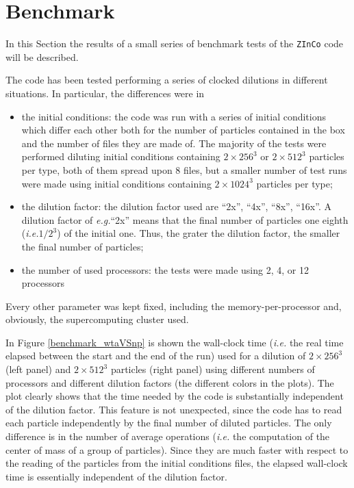 \documentclass[11pt,a4paper,titlepage]{article}
\newcommand{\virg}[1]{``{#1}''}
\newcommand{\ie}{\emph{i.e.}\xspace}
\newcommand{\eg}{\emph{e.g.}\xspace}
\newcommand{\zinco}{\texttt{ZInCo}\xspace}
\begin{document}
\section{Benchmark}
In this Section the results of a small series of benchmark tests of the \zinco code will be described.

The code has been tested performing a series of clocked dilutions in different situations. In particular, the differences were in
\begin{itemize}
\item the initial conditions: the code was run with a series of initial conditions which differ each other both for the number of particles contained in the box and the number of files they are made of. The majority of the tests were performed diluting initial conditions containing $2 \times 256^3$ or $2 \times 512^3$ particles per type, both of them spread upon 8 files, but a smaller number of test runs were made using initial conditions containing $2 \times 1024^3$ particles per type;
\item the dilution factor: the dilution factor used are \virg{2x}, \virg{4x}, \virg{8x}, \virg{16x}. A dilution factor of \eg \virg{2x} means that the final number of particles one eighth (\ie $1/2^3$) of the initial one. Thus, the grater the dilution factor, the smaller the final number of particles;
\item the number of used processors: the tests were made using 2, 4, or 12 processors
\end{itemize}
Every other parameter was kept fixed, including the memory-per-processor and, obviously, the supercomputing cluster used.

In Figure \ref{benchmark_wtaVSnp} is shown the wall-clock time (\ie the real time elapsed between the start and the end of the run) used for a dilution of $2 \times 256^3$ (left panel) and $2 \times 512^3$ particles (right panel) using different numbers of processors and different dilution factors (the different colors in the plots). The plot clearly shows that the time needed by the code is substantially independent of the dilution factor. This feature is not unexpected, since the code has to read each particle independently by the final number of diluted particles. The only difference is in the number of average operations (\ie the computation of the center of mass of a group of particles). Since they are much faster with respect to the reading of the particles from the initial conditions files, the elapsed wall-clock time is essentially independent of the dilution factor.
\end{document}
